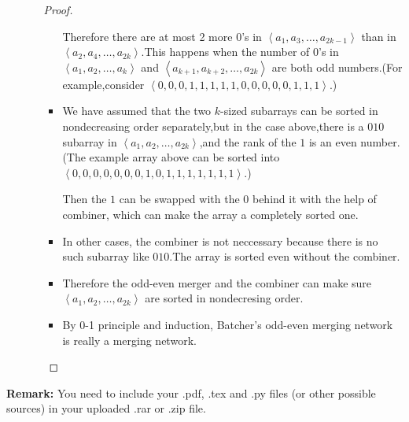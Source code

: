 \documentclass[12pt,a4paper]{article}
\theoremstyle{definition}
\begin{document}
\begin{enumerate}
\begin{enumerate}
\begin{proof}
\begin{itemize}
    			    Therefore there are at most 2 more $0$'s in $\left\langle a_1,a_3,\ldots,a_{2k-1}\right\rangle$ than in $\left\langle a_2,a_4,\ldots,a_{2k}\right\rangle$.This happens when the number of $0$'s in $\left\langle a_1,a_2,\ldots,a_k\right\rangle$ and $\left\langle a_{k+1},a_{k+2},\ldots,a_{2k}\right\rangle$ are both odd numbers.(For example,consider $\left\langle0,0,0,1,1,1,1,1,0,0,0,0,0,1,1,1\right\rangle$.)
    			\item    
    			    We have assumed that the two $k$-sized subarrays can be sorted in nondecreasing order separately,but in the case above,there is a $010$ subarray in $\left\langle a_1,a_2,\ldots,a_{2k}\right\rangle$,and the rank of the $1$ is an even number.(The example array above can be sorted into $\left\langle0,0,0,0,0,0,0,1,0,1,1,1,1,1,1,1\right\rangle$.)
    			    
    			    Then the $1$ can be swapped with the $0$ behind it with the help of combiner, which can make the array a completely sorted one.
    			    
    			\item 
    			    In other cases, the combiner is not neccessary because there is no such subarray like $010$.The array is sorted even without the combiner.
    			    
                \item 
                    Therefore the odd-even merger and the combiner can make sure $\left\langle a_1,a_2,\ldots,a_{2k}\right\rangle$ are sorted in nondecresing order.
    			    
    			\item 
    			    By 0-1 principle and induction, Batcher's odd-even merging network is really a merging network.
    			    
    			    
    		\end{itemize}
    	\end{proof}
    	
    \end{enumerate}

\end{enumerate}

\vspace{20pt}

\textbf{Remark:} You need to include your .pdf, .tex and .py files (or other possible sources) in your uploaded .rar or .zip file.

\end{document}
